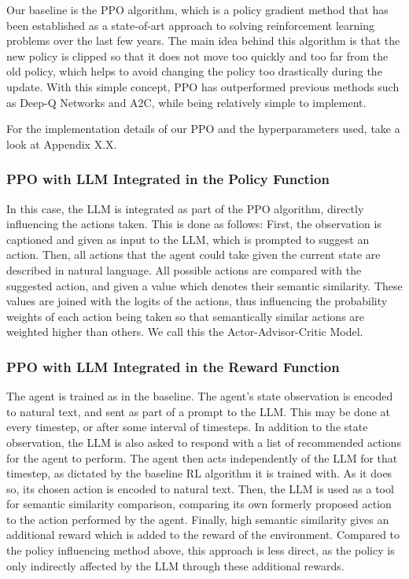 \documentclass[conference]{IEEEtran}
\begin{document}
Our baseline is the PPO algorithm, which is a policy gradient method that has been established as a state-of-art approach to solving reinforcement learning problems over the last few years. The main idea behind this algorithm is that the new policy is clipped so that it does not move too quickly and too far from the old policy, which helps to avoid changing the policy too drastically during the update. With this simple concept, PPO has outperformed previous methods such as Deep-Q Networks and A2C, while being relatively simple to implement\cite{ppo}.

For the implementation details of our PPO and the hyperparameters used, take a look at Appendix X.X.


\subsubsection{PPO with LLM Integrated in the Policy Function}

In this case, the LLM is integrated as part of the PPO algorithm, directly influencing the actions taken. This is done as follows: First, the observation is captioned and given as input to the LLM, which is prompted to suggest an action. Then, all actions that the agent could take given the current state are described in natural language. All possible actions are compared with the suggested action, and given a value which denotes their semantic similarity. These values are joined with the logits of the actions, thus influencing the probability weights of each action being taken so that semantically similar actions are weighted higher than others. We call this the Actor-Advisor-Critic Model.

\subsubsection{PPO with LLM Integrated in the Reward Function}

The agent is trained as in the baseline. The agent's state observation is encoded to natural text, and sent as part of a prompt to the LLM. This may be done at every timestep, or after some interval of timesteps. In addition to the state observation, the LLM is also asked to respond with a list of recommended actions for the agent to perform. The agent then acts independently of the LLM for that timestep, as dictated by the baseline RL algorithm it is trained with. As it does so, its chosen action is encoded to natural text. Then, the LLM is used as a tool for semantic similarity comparison, comparing its own formerly proposed action to the action performed by the agent. Finally, high semantic similarity gives an additional reward which is added to the reward of the environment. Compared to the policy influencing method above, this approach is less direct, as the policy is only indirectly affected by the LLM through these additional rewards.
\end{document}
